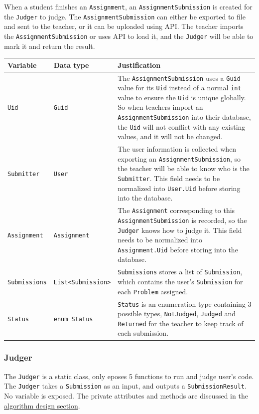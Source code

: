 \documentclass[a4paper]{report}
\begin{document}
When a student finishes an \verb|Assignment|, an \verb|AssignmentSubmission| is created for the \verb|Judger| to judge. The \verb|AssignmentSubmission| can either be exported to file and sent to the teacher, or it can be uploaded using API. The teacher imports the \verb|AssignmentSubmission| or uses API to load it, and the \verb|Judger| will be able to mark it and return the result.

\begin{tabulary}{\textwidth}{|l|l|L|}
    \hline
    Variable & Data type & Justification \\
    \hline
    \verb|Uid| & \verb|Guid| & The \verb|AssignmentSubmission| uses a \verb|Guid| value for its \verb|Uid| instead of a normal \verb|int| value to ensure the \verb|Uid| is unique globally. So when teachers import an \verb|AssignmentSubmission| into their database, the \verb|Uid| will not conflict with any existing values, and it will not be changed. \\
    \hline
    \verb|Submitter| & \verb|User| & The user information is collected when exporting an \verb|AssignmentSubmission|, so the teacher will be able to know who is the \verb|Submitter|. This field needs to be normalized into \verb|User.Uid| before storing into the database. \\
    \hline
    \verb|Assignment| & \verb|Assignment| & The \verb|Assignment| corresponding to this \verb|AssignmentSubmission| is recorded, so the \verb|Judger| knows how to judge it. This field needs to be normalized into \verb|Assignment.Uid| before storing into the database. \\
    \hline
    \verb|Submissions| & \verb|List<Submission>| & \verb|Submissions| stores a list of \verb|Submission|, which contains the user's \verb|Submission| for each \verb|Problem| assigned. \\
    \hline
    \verb|Status| & \verb|enum Status| & \verb|Status| is an enumeration type containing 3 possible types, \verb|NotJudged|, \verb|Judged| and \verb|Returned| for the teacher to keep track of each submission. \\
    \hline
\end{tabulary}

\subsubsection{Judger}

The \verb|Judger| is a static class, only eposes 5 functions to run and judge user's code. The \verb|Judger| takes a \verb|Submission| as an input, and outputs a \verb|SubmissionResult|. No variable is exposed. The private attributes and methods are discussed in the \hyperref[sec:algorithm design]{algorithm design section}.
\end{document}
